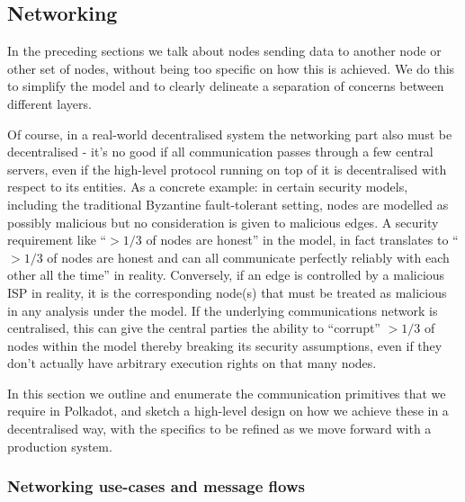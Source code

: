 \subsection{Networking}\label{sec:networking}

In the preceding sections we talk about nodes sending data to another node or
other set of nodes, without being too specific on how this is achieved. We do
this to simplify the model and to clearly delineate a separation of concerns
between different layers.

Of course, in a real-world decentralised system the networking part also must
be decentralised - it's no good if all communication passes through a few
central servers, even if the high-level protocol running on top of it is
decentralised with respect to its entities. As a concrete example: in certain
security models, including the traditional Byzantine fault-tolerant setting,
nodes are modelled as possibly malicious but no consideration is given to
malicious edges. A security requirement like “$> 1/3$ of nodes are honest” in
the model, in fact translates to “$> 1/3$ of nodes are honest and can all
communicate perfectly reliably with each other all the time” in reality.
Conversely, if an edge is controlled by a malicious ISP in reality, it is the
corresponding node(s) that must be treated as malicious in any analysis under
the model. If the underlying communications network is centralised, this can
give the central parties the ability to “corrupt” $> 1/3$ of nodes within the
model thereby breaking its security assumptions, even if they don't actually
have arbitrary execution rights on that many nodes.

In this section we outline and enumerate the communication primitives that we
require in Polkadot, and sketch a high-level design on how we achieve these in
a decentralised way, with the specifics to be refined as we move forward with a
production system.

\subsubsection{Networking use-cases and message flows}

